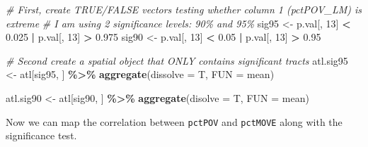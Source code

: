 \documentclass[
]{book}
\newenvironment{Shaded}{\begin{snugshade}}{\end{snugshade}}
\newcommand{\AttributeTok}[1]{\textcolor[rgb]{0.13,0.29,0.53}{#1}}
\newcommand{\CommentTok}[1]{\textcolor[rgb]{0.56,0.35,0.01}{\textit{#1}}}
\newcommand{\DecValTok}[1]{\textcolor[rgb]{0.00,0.00,0.81}{#1}}
\newcommand{\FloatTok}[1]{\textcolor[rgb]{0.00,0.00,0.81}{#1}}
\newcommand{\FunctionTok}[1]{\textcolor[rgb]{0.13,0.29,0.53}{\textbf{#1}}}
\newcommand{\NormalTok}[1]{#1}
\newcommand{\OtherTok}[1]{\textcolor[rgb]{0.56,0.35,0.01}{#1}}
\newcommand{\SpecialCharTok}[1]{\textcolor[rgb]{0.81,0.36,0.00}{\textbf{#1}}}
\begin{document}
\begin{Shaded}
\begin{Highlighting}[]
\CommentTok{\# First, create TRUE/FALSE vectors testing whether column 1 (pctPOV\_LM) is extreme}
\CommentTok{\# I am using 2 significance levels: 90\% and 95\%}
\NormalTok{sig95 }\OtherTok{\textless{}{-}}\NormalTok{ p.val[, }\DecValTok{13}\NormalTok{] }\SpecialCharTok{\textless{}} \FloatTok{0.025} \SpecialCharTok{|}\NormalTok{ p.val[, }\DecValTok{13}\NormalTok{] }\SpecialCharTok{\textgreater{}} \FloatTok{0.975}
\NormalTok{sig90 }\OtherTok{\textless{}{-}}\NormalTok{ p.val[, }\DecValTok{13}\NormalTok{] }\SpecialCharTok{\textless{}} \FloatTok{0.05} \SpecialCharTok{|}\NormalTok{ p.val[, }\DecValTok{13}\NormalTok{] }\SpecialCharTok{\textgreater{}} \FloatTok{0.95}

\CommentTok{\# Second create a spatial object that ONLY contains significant tracts}
\NormalTok{atl.sig95 }\OtherTok{\textless{}{-}}\NormalTok{ atl[sig95, ] }\SpecialCharTok{\%\textgreater{}\%} 
  \FunctionTok{aggregate}\NormalTok{(}\AttributeTok{dissolve =}\NormalTok{ T, }\AttributeTok{FUN =}\NormalTok{ mean) }

\NormalTok{atl.sig90 }\OtherTok{\textless{}{-}}\NormalTok{ atl[sig90, ] }\SpecialCharTok{\%\textgreater{}\%}
  \FunctionTok{aggregate}\NormalTok{(}\AttributeTok{disolve =}\NormalTok{ T, }\AttributeTok{FUN =}\NormalTok{ mean)}
\end{Highlighting}
\end{Shaded}

Now we can map the correlation between \texttt{pctPOV} and \texttt{pctMOVE} along with the significance test.
\end{document}
